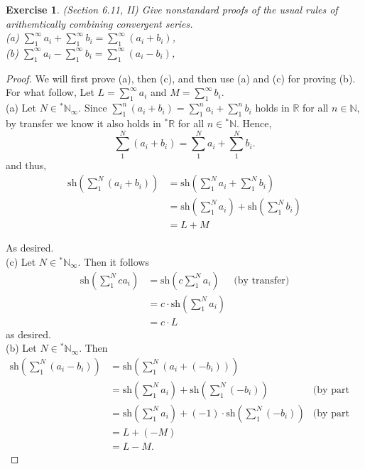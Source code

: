 \documentclass[a4paper, 11pt]{book}
\theoremstyle{plain}
\newtheorem{exercise}{Exercise}[chapter]
\theoremstyle{plain}
\newcommand{\N}{\mathbb{N}}
\newcommand{\R}{\mathbb{R}}
\newcommand{\hyp}{{}^*}
\newcommand{\sh}{\text{sh}}
\begin{document}
  \begin{exercise}
    (Section 6.11, II)
    Give nonstandard proofs of the usual rules of arithemtically combining convergent series. \\
    (a) $\sum_{1}^\infty a_i+\sum_{1}^\infty b_i=\sum_{1}^\infty (a_i+b_i)$, \\
    (b) $\sum_1^\infty a_i-\sum_1^\infty b_i=\sum_1^\infty (a_i-b_i)$,
  \end{exercise}
  \begin{proof} We will first prove (a), then (c), and then use (a) and (c) for proving (b). For what follow, Let $L=\sum_{1}^\infty a_i$ and $M=\sum_{1}^\infty b_i$. \\
    (a) Let $N \in \hyp \N_\infty$. Since $\sum_{1}^n (a_i+b_i)=\sum_{1}^n a_i+\sum_{1}^n b_i$ holds in $\R$ for all $n \in \N$, by transfer we know it also holds in $\hyp \R$ for all $n \in \hyp \N$. Hence, $$\sum_{1}^N (a_i+b_i)=\sum_{1}^N a_i+\sum_{1}^N b_i.$$ and thus, 
    \begin{align*}
      \sh \left(\sum_{1}^N (a_i+b_i)\right) &=\sh \left(\sum_{1}^N a_i+\sum_{1}^N b_i \right) \\
      &=\sh \left(\sum_{1}^N a_i \right)+\sh \left( \sum_{1}^N b_i \right) \\
      &= L+M
    \end{align*}

    As desired. \\

    (c) Let $N \in \hyp \N_\infty$. Then it follows 
    \begin{align*}
      \sh \left( \sum_{1}^N ca_i \right) &= \sh \left(c\sum_1^N a_i \right) &\text{(by transfer)}\\
      &= c\cdot \sh \left( \sum_1^N a_i \right) \\
      &=c \cdot L
    \end{align*}
    as desired. \\

    (b) Let $N \in \hyp \N_\infty$. Then 
    \begin{align*}
      \sh \left( \sum_1^N (a_i-b_i)\right) &= \sh \left( \sum_1^N (a_i+(-b_i))\right) \\
      &=\sh \left(\sum_{1}^N a_i \right)+\sh \left( \sum_{1}^N (-b_i) \right) &\text{(by part a)}\\
      &= \sh \left(\sum_{1}^N a_i \right) +(-1) \cdot \sh \left( \sum_{1}^N (-b_i) \right) &\text{(by part c)} \\
      &=L+(-M) \\
      &=L-M.
    \end{align*}
  \end{proof}
\end{document}
